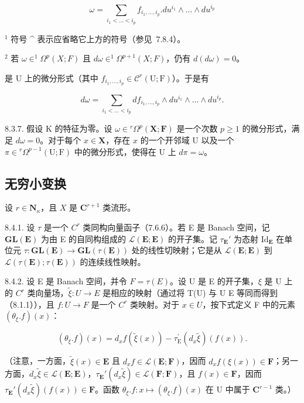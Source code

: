 \[
\omega = \sum_ {i _ {1} <   \dots <   i _ {p}} f _ {i _ {1}, \dots , i _ {p}}. d u ^ {i _ {1}} \wedge \dots \wedge d u ^ {i _ {p}}
\]

\(^{1}\) 符号 \^{} 表示应省略它上方的符号（参见~7.8.4）。

\(^{2}\) 若 \(\omega\in^{1}\Omega^{p}(X;F)\) 且 \(d\omega\in^{1}\Omega^{p+1}(X;F)\)，仍有 \(d(d\omega)=0\)。

是 U 上的微分形式（其中 \(f_{i_1,\ldots,i_p} \in \mathcal{C}^r(\mathrm{U};\mathrm{F})\)）。于是有

\[
d \omega = \sum_ {i _ {1} <   \dots <   i _ {p}} d f _ {i _ {1}, \dots , i _ {p}} \wedge d u ^ {i _ {1}} \wedge \dots \wedge d u ^ {i _ {p}}.\tag{11}
\]

8.3.7. 假设 K 的特征为零。设 \(\omega \in {}^r\Omega^p (\mathbf{X};\mathbf{F})\) 是一个次数 \(p\geqslant 1\) 的微分形式，满足 \(d\omega = 0\)。对于每个 \(x\in \mathbf{X}\)，存在 \(x\) 的一个开邻域 U 以及一个 \(\pi \in {}^r\Omega^{p - 1}(\mathrm{U};\mathrm{F})\) 中的微分形式，使得在 U 上 \(d\pi = \omega\)。

\subsection{无穷小变换}

设 \(r \in \mathbf{N}_{\kappa}\)，且 \(X\) 是 \(\mathbf{C}^{r+1}\) 类流形。

8.4.1. 设 \(\tau\) 是一个 \(C^r\) 类同构向量函子（7.6.6）。若 E 是 Banach 空间，记 \(\mathbf{GL}(\mathbf{E})\) 为由 E 的自同构组成的 \(\mathcal{L}(\mathbf{E};\mathbf{E})\) 的开子集。记 \(\tau_{\mathbf{E}}'\) 为态射 \(\mathrm{Id}_{\mathbf{E}}\) 在单位元 \(\tau\colon\mathbf{GL}(\mathbf{E})\to\mathbf{GL}(\tau(\mathbf{E}))\) 处的线性切映射；它是从 \(\mathcal{L}(\mathbf{E};\mathbf{E})\) 到 \(\mathcal{L}(\tau(\mathbf{E});\tau(\mathbf{E}))\) 的连续线性映射。

8.4.2. 设 E 是 Banach 空间，并令 \(F = \tau(E)\)。设 U 是 E 的开子集，\(\xi\) 是 U 上的 \(C^r\) 类向量场，\(\tilde{\xi} \colon U \to E\) 是相应的映射（通过将 T(U) 与 U \times E 等同而得到（8.1.1）），且 \(f \colon U \to F\) 是一个 \(C^r\) 类映射。对于 \(x \in U\)，按下式定义 F 中的元素 \((\theta_\xi.f)(x)\)：

\[
(\theta_ {\xi}. f) (x) = d _ {x} f (\tilde {\xi} (x)) - \tau_ {\mathrm{E}} ^ {\prime} (d _ {x} \tilde {\xi}) (f (x)).\tag{1}
\]

（注意，一方面，\(\tilde{\xi}(x) \in \mathbf{E}\) 且 \(d_x f \in \mathcal{L}(\mathbf{E}; \mathbf{F})\)，因而 \(d_x f(\xi(x)) \in \mathbf{F}\)；另一方面，\(d_x \tilde{\xi} \in \mathcal{L}(\mathbf{E}; \mathbf{E})\)，\(\tau_{\mathbf{E}}'(d_x \tilde{\xi}) \in \mathcal{L}(\mathbf{F}; \mathbf{F})\)，且 \(f(x) \in \mathbf{F}\)，因而 \(\tau_{\mathbf{E}}'(d_x \tilde{\xi})(f(x)) \in \mathbf{F}\)。函数 \(\theta_{\xi}.f: x \mapsto (\theta_{\xi}.f)(x)\) 在 U 中属于 \(\mathbf{C}^{r-1}\) 类。）

